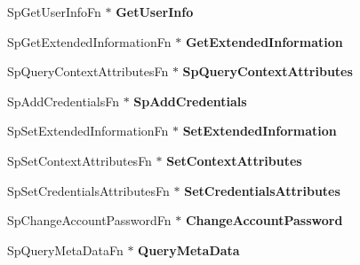 \begin{DoxyCompactItemize}
Sp\+Get\+User\+Info\+Fn $\ast$ {\bfseries Get\+User\+Info}
\item 
\mbox{\label{struct_s_e_c_p_k_g___f_u_n_c_t_i_o_n___t_a_b_l_e_a90d7a1eaeba62c9b236ddc00cf16c8f4}} 
Sp\+Get\+Extended\+Information\+Fn $\ast$ {\bfseries Get\+Extended\+Information}
\item 
\mbox{\label{struct_s_e_c_p_k_g___f_u_n_c_t_i_o_n___t_a_b_l_e_ad8d9eca85644062cad8e8f114f5f568f}} 
Sp\+Query\+Context\+Attributes\+Fn $\ast$ {\bfseries Sp\+Query\+Context\+Attributes}
\item 
\mbox{\label{struct_s_e_c_p_k_g___f_u_n_c_t_i_o_n___t_a_b_l_e_a7195ec5cda038f1377d3e71c25732893}} 
Sp\+Add\+Credentials\+Fn $\ast$ {\bfseries Sp\+Add\+Credentials}
\item 
\mbox{\label{struct_s_e_c_p_k_g___f_u_n_c_t_i_o_n___t_a_b_l_e_ac2b103f67de14b5b323cabd2e4e9870c}} 
Sp\+Set\+Extended\+Information\+Fn $\ast$ {\bfseries Set\+Extended\+Information}
\item 
\mbox{\label{struct_s_e_c_p_k_g___f_u_n_c_t_i_o_n___t_a_b_l_e_a0ad1264ffda6445b89c3f602f1d904af}} 
Sp\+Set\+Context\+Attributes\+Fn $\ast$ {\bfseries Set\+Context\+Attributes}
\item 
\mbox{\label{struct_s_e_c_p_k_g___f_u_n_c_t_i_o_n___t_a_b_l_e_addd4956da0addcac96f8635f2440793e}} 
Sp\+Set\+Credentials\+Attributes\+Fn $\ast$ {\bfseries Set\+Credentials\+Attributes}
\item 
\mbox{\label{struct_s_e_c_p_k_g___f_u_n_c_t_i_o_n___t_a_b_l_e_a23ff7c88995c411b19dfa78d47d85231}} 
Sp\+Change\+Account\+Password\+Fn $\ast$ {\bfseries Change\+Account\+Password}
\item 
\mbox{\label{struct_s_e_c_p_k_g___f_u_n_c_t_i_o_n___t_a_b_l_e_a9898ad65424bfd0e1f5d6caf8e4d359c}} 
Sp\+Query\+Meta\+Data\+Fn $\ast$ {\bfseries Query\+Meta\+Data}

\end{DoxyCompactItemize}
